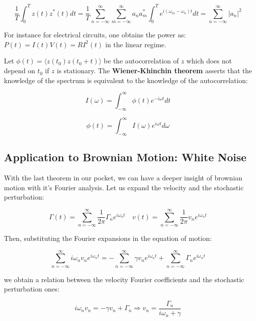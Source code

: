 \documentclass{article}
\begin{document}
\begin{equation}
\frac{1}{T} \int_{0}^{T} z(t)z^*(t) dt = \frac{1}{T} \sum_{n = -\infty}^{\infty} \sum_{m = -\infty}^{\infty} a_n a_m^* \int_{0}^{T} e^{i(\omega_m-\omega_n)t} dt = \sum_{n = -\infty}^{\infty} |a_n|^2
\end{equation}

For instance for electrical circuits, one obtains the power as: $P(t) = I(t)V(t) = RI^2(t)$ in the linear regime.
\newline

Let $\phi(t) = \langle z(t_0) z(t_0+t) \rangle$ be the autocorrelation of $z$ which does not depend on $t_0$ if $z$ is stationary. The \textbf{Wiener-Khinchin theorem} asserts that the knowledge of the spectrum is equivalent to the knowledge of the autocorrelation:

$$I(\omega) = \int_{- \infty}^{ \infty } \phi(t) e^{-i \omega t} dt $$

\begin{equation}
\phi (t) = \int_{- \infty}^{ \infty } I(\omega) e^{i \omega t} d\omega
\end{equation}
\subsection{Application to Brownian Motion: White Noise}

With the last theorem in our pocket, we can have a deeper insight of brownian motion with it's Fourier analysis. Let us expand the velocity and the stochastic perturbation:

\begin{equation}
\Gamma(t) = \sum_{n = -\infty}^{\infty} \frac{1}{ 2 \pi} \Gamma_n e^{ i\omega_n t} \quad v(t) = \sum_{n = -\infty}^{\infty} \frac{1}{ 2 \pi} v_n e^{ i\omega_n t}
\end{equation}

Then, substituting the Fourier expansions in the equation of motion:

$$ \sum_{n = -\infty}^{\infty} i \omega_n v_n e^{ i\omega_n t} =  - \sum_{n = -\infty}^{\infty}  \gamma v_n e^{ i\omega_n t} + \sum_{n = -\infty}^{\infty} \Gamma_n e^{ i\omega_n t}  $$

we obtain a relation between the velocity Fourier coefficients and the stochastic perturbation ones:

\begin{equation}
 i \omega_n v_n = -  \gamma v_n + \Gamma_n \Rightarrow v_n = \frac{\Gamma_n}{i \omega_n + \gamma}
\end{equation}
\end{document}

